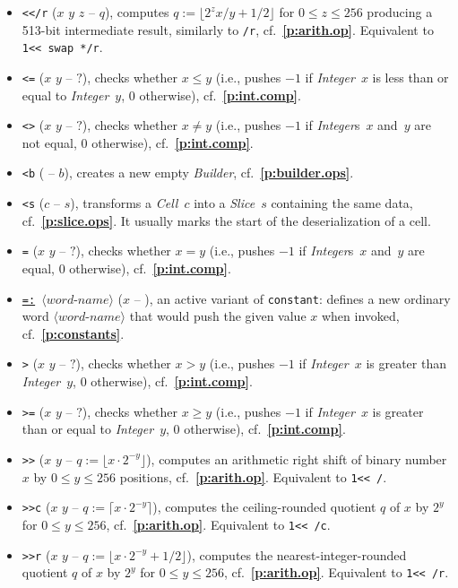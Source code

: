 \documentclass[12pt,oneside]{article}
\def\refpoint#1{{\rm\textbf{\ref{#1}}}}
\let\ptref=\refpoint
\begin{document}
\begin{itemize}
\item {\tt <{}</r} ($x$ $y$ $z$ -- $q$), computes $q:=\lfloor 2^zx/y+1/2\rfloor$ for $0\leq z\leq 256$ producing a 513-bit intermediate result, similarly to {\tt */r}, cf.~\ptref{p:arith.op}. Equivalent to {\tt 1<{}< swap */r}.
\item {\tt <=} ($x$ $y$ -- $?$), checks whether $x\leq y$ (i.e., pushes $-1$ if {\em Integer\/}~$x$ is less than or equal to {\em Integer\/}~$y$, $0$ otherwise), cf.~\ptref{p:int.comp}.
\item {\tt <>} ($x$ $y$ -- $?$), checks whether $x\neq y$ (i.e., pushes $-1$ if {\em Integer\/}s~$x$ and~$y$ are not equal, $0$ otherwise), cf.~\ptref{p:int.comp}.
\item {\tt <b} ( -- $b$), creates a new empty {\em Builder}, cf.~\ptref{p:builder.ops}.
\item {\tt <s} ($c$ -- $s$), transforms a {\em Cell\/}~$c$ into a {\em Slice\/}~$s$ containing the same data, cf.~\ptref{p:slice.ops}. It usually marks the start of the deserialization of a cell.
\item {\tt =} ($x$ $y$ -- $?$), checks whether $x=y$ (i.e., pushes $-1$ if {\em Integer\/}s~$x$ and~$y$ are equal, $0$ otherwise), cf.~\ptref{p:int.comp}.
\item {\tt \underline{=:} $\langle\textit{word-name}\rangle$} ($x$ -- ), an active variant of {\tt constant}: defines a new ordinary word $\langle\textit{word-name}\rangle$ that would push the given value $x$ when invoked, cf.~\ptref{p:constants}.
\item {\tt >} ($x$ $y$ -- $?$), checks whether $x>y$ (i.e., pushes $-1$ if {\em Integer\/}~$x$ is greater than {\em Integer\/}~$y$, $0$ otherwise), cf.~\ptref{p:int.comp}.
\item {\tt >=} ($x$ $y$ -- $?$), checks whether $x\geq y$ (i.e., pushes $-1$ if {\em Integer\/}~$x$ is greater than or equal to {\em Integer\/}~$y$, $0$ otherwise), cf.~\ptref{p:int.comp}.
\item {\tt >{}>} ($x$ $y$ -- $q:=\lfloor x\cdot 2^{-y}\rfloor$), computes an arithmetic right shift of binary number $x$ by $0\leq y\leq 256$ positions, cf.~\ptref{p:arith.op}. Equivalent to {\tt 1<{}< /}.
\item {\tt >{}>c} ($x$ $y$ -- $q:=\lceil x\cdot 2^{-y}\rceil$), computes the ceiling-rounded quotient $q$ of $x$ by $2^y$ for $0\leq y\leq 256$, cf.~\ptref{p:arith.op}. Equivalent to {\tt 1<{}< /c}.
\item {\tt >{}>r} ($x$ $y$ -- $q:=\lfloor x\cdot 2^{-y}+1/2\rfloor$), computes the nearest-integer-rounded quotient $q$ of $x$ by $2^y$ for $0\leq y\leq 256$, cf.~\ptref{p:arith.op}. Equivalent to {\tt 1<{}< /r}.

\end{itemize}
\end{document}
